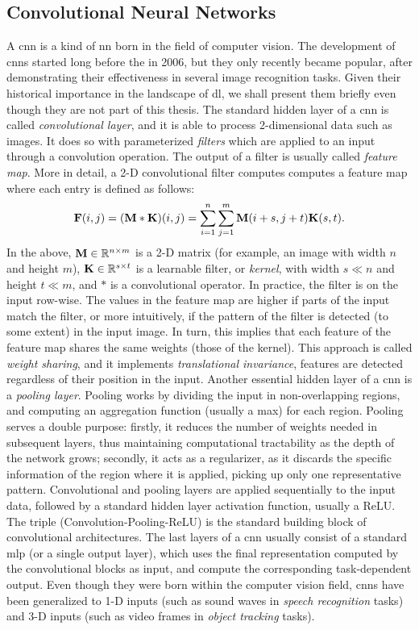 \subsection{Convolutional Neural Networks}
A \gls{cnn} is a kind of \gls{nn} born in the field of computer vision. The development of \glspl{cnn} started long before the  in 2006, but they only recently became popular, after demonstrating their effectiveness in several image recognition tasks. Given their historical importance in the landscape of \gls{dl}, we shall present them briefly even though they are not part of this thesis. The standard hidden layer of a \gls{cnn} is called \emph{convolutional layer}, and it is able to process 2-dimensional data such as images. It does so with parameterized \emph{filters} which are applied to an input through a convolution operation. The output of a filter is usually called \emph{feature map}. More in detail, a 2-D convolutional filter computes computes a feature map where each entry is defined as follows:
$$\Matrix{F}(i, j) = (\Matrix{M} * \Matrix{K})(i, j) = \sum_{i=1}^{n} \sum_{j=1}^{m} \Matrix{M}(i+s, j+t)\Matrix{K}(s,t).$$
In the above, $\Matrix{M} \in \Real^{n \times m}$ is a 2-D matrix (for example, an image with width $n$ and height $m$), $\Matrix{K} \in \Real^{s \times t}$ is a learnable filter, or \emph{kernel}, with width $s \ll n$ and height $t \ll m$, and $*$ is a convolutional operator. In practice, the filter is  on the input row-wise. The values in the feature map are higher if parts of the input match the filter, or more intuitively, if the pattern of the filter is detected (to some extent) in the input image. In turn, this implies that each feature of the feature map shares the same weights (those of the kernel). This approach is called \emph{weight sharing}, and it implements \emph{translational invariance}, \ie features are detected regardless of their position in the input. Another essential hidden layer of a \gls{cnn} is a \emph{pooling layer}. Pooling works by dividing the input in non-overlapping regions, and computing an aggregation function (usually a max) for each region. Pooling serves a double purpose: firstly, it reduces the number of weights needed in subsequent layers, thus maintaining computational tractability as the depth of the network grows; secondly, it acts as a regularizer, as it discards the specific information of the region where it is applied, picking up only one representative pattern. Convolutional and pooling layers are applied sequentially to the input data, followed by a standard hidden layer activation function, usually a ReLU. The triple (Convolution-Pooling-ReLU) is the standard building block of convolutional architectures. The last layers of a \gls{cnn} usually consist of a standard \gls{mlp} (or a single output layer), which uses the final representation computed by the convolutional blocks as input, and compute the corresponding task-dependent output. Even though they were born within the computer vision field, \glspl{cnn} have been generalized to 1-D inputs (such as sound waves in \emph{speech recognition} tasks) and 3-D inputs (such as video frames in \emph{object tracking} tasks).

